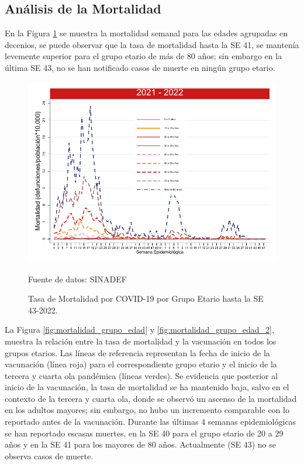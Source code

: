 \documentclass[12pt,a4paper,openany]{book}
\begin{document}
	\subsection*{Análisis de la Mortalidad}
	
	\noindent En la Figura \ref{fig:mortalidad_edad} se muestra la mortalidad semanal para las edades agrupadas en decenios,  se puede observar que la tasa de mortalidad hasta la SE 41, se mantenía levemente superior para el grupo etario de más de 80 años; sin embargo en la última SE 43, no se han notificado casos de muerte en ningún grupo etario.
	
	\begin{figure}[h]
		\caption{Tasa de Mortalidad por COVID-19 por Grupo Etario hasta la SE 43-2022.}\label{fig:mortalidad_edad}
		\begin{center}
			\includegraphics[width=0.65\linewidth]{../figuras/mortalidad_edad_2021_2022.pdf}
		\end{center}
		{\footnotesize Fuente de datos: SINADEF} 
	\end{figure}
	
	
	La Figura \ref{fig:mortalidad_grupo_edad} y 
	\ref{fig:mortalidad_grupo_edad_2},
	muestra la relación entre la tasa de mortalidad y la vacunación en todos los grupos etarios. Las líneas de referencia  representan la fecha de inicio de la vacunación (línea roja) para el correspondiente grupo etario y el inicio de la tercera y cuarta ola pandémica (líneas verdes). Se evidencia que posterior al inicio de la vacunación, la tasa de mortalidad se ha mantenido baja, salvo en el contexto de la tercera y cuarta ola, donde se observó un ascenso de la mortalidad en los adultos mayores; sin embargo, no hubo un incremento comparable con lo reportado antes de la vacunación. Durante las últimas 4 semanas epidemiológicas se han reportado escasas muertes, en la SE 40 para el grupo etario de 20 a 29 años y en la SE 41 para los mayores de 80 años. Actualmente (SE 43) no se observa casos de muerte.
	
\end{document}
